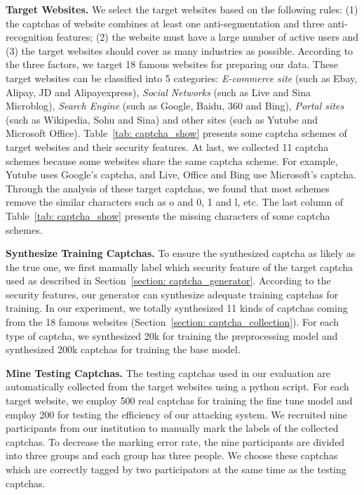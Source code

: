 \noindent \textbf{Target Websites.} We select the target websites based on the following rules: (1) the captchas of website combines at least one anti-segmentation and three anti-recognition features; (2) the website must have a large number of active users and (3) the target websites should cover as many industries as possible.
According to the three factors, we target 18 famous websites for preparing our data. These target websites can be classified into 5 categories: \emph{E-commerce site} (such as Ebay, Alipay, JD and Alipayexpress), \emph{Social Networks} (such as Live and Sina Microblog), \emph{Search Engine} (such as Google, Baidu, 360 and Bing), \emph{Portal sites} (such as Wikipedia, Sohu and Sina) and other sites (such as Yutube and Microsoft Office).
 Table~\ref{tab: captcha_show} presents some captcha schemes of target websites and their security features.
 At last, we collected 11 captcha schemes because some websites share the same captcha scheme. For example, Yutube uses Google’s captcha, and Live, Office and Bing use Microsoft’s captcha. Through the analysis of these target captchas, we found that most schemes remove the similar characters such as o and 0, 1 and l, etc. The last column of Table~\ref{tab: captcha_show} presents the missing characters of some captcha schemes.


\noindent \textbf{Synthesize Training Captchas.} 
To ensure the synthesized captcha as likely as the true one, we first manually label which security feature of the target captcha used as described in Section~\ref{section: captcha_generator}. According to the security features, our generator can synthesize adequate training captchas for training. In our experiment, we totally synthesized 11 kinds of captchas coming from the 18 famous websites (Section~\ref{section: captcha_collection}). For each type of captcha, we synthesized 20k for training the preprocessing model and synthesized 200k captchas for training the base model.

\noindent \textbf{Mine Testing Captchas.} 
The testing captchas used in our evaluation are automatically collected from the target websites using a python script. For each target website, we employ 500 real captchas for training the fine tune model and employ 200 for testing the efficiency of our attacking system. We recruited nine participants from our institution to manually mark the labels of the collected captchas. To decrease the marking error rate, the nine participants are divided into three groups and each group has three people. We choose these captchas which are correctly tagged by two participators at the same time as the testing captchas.

